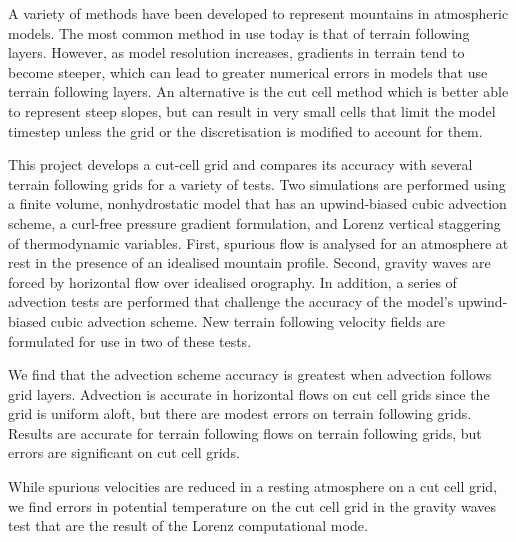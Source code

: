 A variety of methods have been developed to represent mountains in atmospheric models.  The most common method in use today is that of terrain following layers.  However, as model resolution increases, gradients in terrain tend to become steeper, which can lead to greater numerical errors in models that use terrain following layers.  An alternative is the cut cell method which is better able to represent steep slopes, but can result in very small cells that limit the model timestep unless the grid or the discretisation is modified to account for them.

This project develops a cut-cell grid and compares its accuracy with several terrain following grids for a variety of tests.  Two simulations are performed using a finite volume, nonhydrostatic model that has an upwind-biased cubic advection scheme, a curl-free pressure gradient formulation, and Lorenz vertical staggering of thermodynamic variables.  First, spurious flow is analysed for an atmosphere at rest in the presence of an idealised mountain profile.  Second, gravity waves are forced by horizontal flow over idealised orography.  In addition, a series of advection tests are performed that challenge the accuracy of the model's upwind-biased cubic advection scheme.  New terrain following velocity fields are formulated for use in two of these tests.

We find that the advection scheme accuracy is greatest when advection follows grid layers.  Advection is accurate in horizontal flows on cut cell grids since the grid is uniform aloft, but there are modest errors on terrain following grids.  Results are accurate for terrain following flows on terrain following grids, but errors are significant on cut cell grids.

While spurious velocities are reduced in a resting atmosphere on a cut cell grid, we find errors in potential temperature on the cut cell grid in the gravity waves test that are the result of the Lorenz computational mode.

